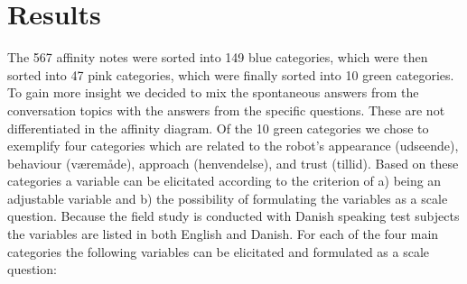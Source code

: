 \section{Results}
\label{Results}
%
The 567 affinity notes were sorted into 149 blue categories, which were then sorted into 47 pink categories, which were finally sorted into 10 green categories. To gain more insight we decided to mix the spontaneous answers from the conversation topics with the answers from the specific questions. These are not differentiated in the affinity diagram. Of the 10 green categories we chose to exemplify four categories which are related to the robot’s appearance (udseende), behaviour (væremåde), approach (henvendelse), and trust (tillid). Based on these categories a variable can be elicitated according to the criterion of a) being an adjustable variable and b) the possibility of formulating the variables as a scale question. Because the field study is conducted with Danish speaking test subjects the variables are listed in both English and Danish. For each of the four main categories the following variables can be elicitated and formulated as a scale question:\\
%
